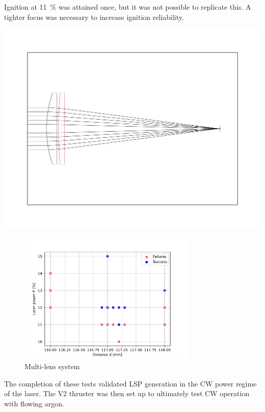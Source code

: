            Ignition at \qty{11}{\%} was attained once, but it was not possible to replicate this. A tighter focus was necessary to increase ignition reliability.

            \includegraphics[width=\textwidth]{assets/5 results/500 and 150 lenses.pdf}

            \begin{figure}[h]
                \centering
                \includegraphics[width=0.75\textwidth]{assets/5 results/duallens_focus_threshold.pdf}
                \caption{Multi-lens system}
            \end{figure}


            The completion of these tests validated LSP generation in the CW power regime of the laser. The V2 thruster was then set up to ultimately test CW operation with flowing argon.
        

